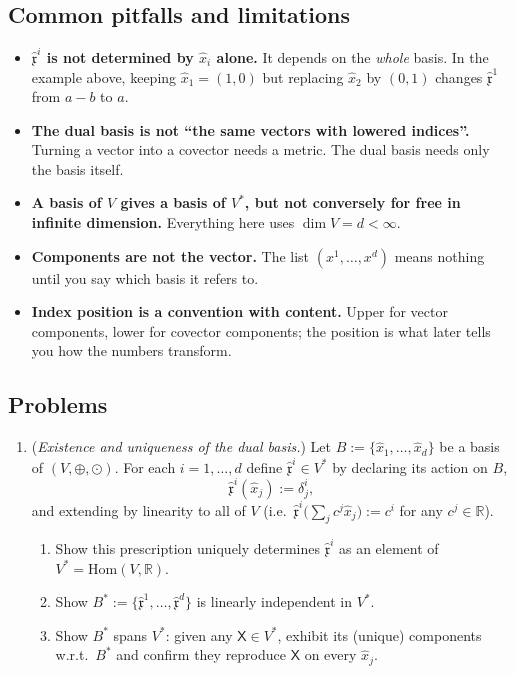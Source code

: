 \documentclass[11pt]{article}
\newcommand{\Vsp}{(V, \oplus, \odot)}
\newcommand{\dual}{V^{*}}
\begin{document}
\subsection*{Common pitfalls and limitations}

\begin{itemize}
  \item \textbf{$\hat{\mathfrak x}^i$ is not determined by $\hat x_i$ alone.} It depends on the \emph{whole} basis. In the example above, keeping $\hat x_1=(1,0)$ but replacing $\hat x_2$ by $(0,1)$ changes $\hat{\mathfrak x}^1$ from $a-b$ to $a$.
  \item \textbf{The dual basis is not ``the same vectors with lowered indices''.} Turning a vector into a covector needs a metric. The dual basis needs only the basis itself.
  \item \textbf{A basis of $V$ gives a basis of $\dual$, but not conversely for free in infinite dimension.} Everything here uses $\dim V=d<\infty$.
  \item \textbf{Components are not the vector.} The list $(x^1,\dots,x^d)$ means nothing until you say which basis it refers to.
  \item \textbf{Index position is a convention with content.} Upper for vector components, lower for covector components; the position is what later tells you how the numbers transform.
\end{itemize}

\subsection*{Problems}

\begin{enumerate}[label=\textbf{2.\arabic*}, leftmargin=2.2cm, start=5]

\item \label{prob:dual-basis}
(\textit{Existence and uniqueness of the dual basis.})
Let $B := \{\hat{x}_1,\dots,\hat{x}_d\}$ be a basis of $\Vsp$. For each $i = 1,\dots,d$ define $\hat{\mathfrak{x}}^i \in \dual$ by declaring its action on $B$,
\[
\hat{\mathfrak{x}}^i(\hat{x}_j) := \delta^i_j,
\]
and extending by linearity to all of $V$ (i.e.\ $\hat{\mathfrak x}^i\big(\sum_j c^j\hat x_j\big):=c^i$ for any $c^j\in\mathbb R$).
\begin{enumerate}[label=(\alph*)]
  \item Show this prescription uniquely determines $\hat{\mathfrak{x}}^i$ as an element of $\dual = \mathrm{Hom}(V,\mathbb{R})$.
  \item Show $B^* := \{\hat{\mathfrak{x}}^1,\dots,\hat{\mathfrak{x}}^d\}$ is linearly independent in $\dual$.
  \item Show $B^*$ spans $\dual$: given any $\mathsf{X} \in \dual$, exhibit its (unique) components w.r.t.\ $B^*$ and confirm they reproduce $\mathsf{X}$ on every $\hat{x}_j$.
\end{enumerate}

\end{enumerate}
\end{document}
